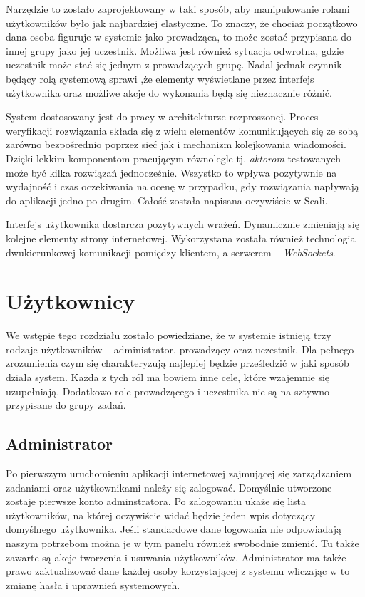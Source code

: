 \documentclass[brudnopis]{xmgr}
\begin{document}
Narzędzie to zostało zaprojektowany w taki sposób, aby manipulowanie rolami użytkowników było jak najbardziej elastyczne. To znaczy, że chociaż początkowo dana osoba figuruje w systemie jako prowadząca, to może zostać przypisana do innej grupy jako jej uczestnik. Możliwa jest również sytuacja odwrotna, gdzie uczestnik może stać się jednym z prowadzących grupę. Nadal jednak czynnik będący rolą systemową sprawi ,że elementy wyświetlane przez interfejs użytkownika oraz możliwe akcje do wykonania będą się nieznacznie różnić.

System dostosowany jest do pracy w architekturze rozproszonej. Proces weryfikacji rozwiązania składa się z wielu elementów komunikujących się ze sobą zarówno bezpośrednio poprzez sieć jak i mechanizm kolejkowania wiadomości. Dzięki lekkim komponentom pracującym równolegle tj. \emph{aktorom} testowanych może być kilka rozwiązań jednocześnie. Wszystko to wpływa pozytywnie na wydajność i czas oczekiwania na ocenę w przypadku, gdy rozwiązania napływają do aplikacji jedno po drugim. Całość została napisana oczywiście w Scali. 
 
Interfejs użytkownika dostarcza pozytywnych wrażeń. Dynamicznie zmieniają się kolejne elementy strony internetowej. Wykorzystana została również technologia dwukierunkowej komunikacji pomiędzy klientem, a serwerem -- \emph{WebSockets}. 

\section{Użytkownicy}

We wstępie tego rozdziału zostało powiedziane, że w systemie istnieją trzy rodzaje użytkowników -- administrator, prowadzący oraz uczestnik. Dla pełnego zrozumienia czym się charakteryzują najlepiej będzie prześledzić w jaki sposób działa system. Każda z tych ról ma bowiem inne cele, które wzajemnie się uzupełniają. Dodatkowo role prowadzącego i uczestnika nie są na sztywno przypisane do grupy zadań. 

\subsection{Administrator}

Po pierwszym uruchomieniu aplikacji internetowej zajmującej się zarządzaniem zadaniami oraz użytkownikami należy się zalogować. Domyślnie utworzone zostaje pierwsze konto adminstratora. Po zalogowaniu ukaże się lista użytkowników, na której oczywiście widać będzie jeden wpis dotyczący domyślnego użytkownika. Jeśli standardowe dane logowania nie odpowiadają naszym potrzebom można je w tym panelu również swobodnie zmienić. Tu także zawarte są akcje tworzenia i usuwania użytkowników. Administrator ma także prawo zaktualizować dane każdej osoby korzystającej z systemu wliczając w to zmianę hasła i uprawnień systemowych.
\end{document}
